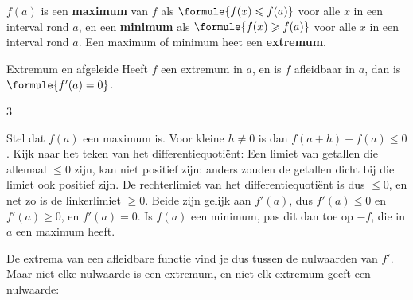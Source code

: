 \begin{theorie}
$f(a)$ is een \textbf{\textcolor{accent}{maximum}} van $f$ als $\formule{f(x) \leqslant f(a)}$ voor alle $x$ in een interval rond $a$, en een \textbf{\textcolor{accent}{minimum}} als $\formule{f(x) \geqslant f(a)}$ voor alle $x$ in een interval rond $a$. Een maximum of minimum heet een \textbf{\textcolor{accent}{extremum}}.

\begin{stelling}{Extremum en afgeleide}
Heeft $f$ een extremum in $a$, en is $f$ afleidbaar in $a$, dan is $\formule{f'(a) = 0}$.
\end{stelling}
\begin{alleenvoor}{3}
\begin{bewijs}
Stel dat $f(a)$ een maximum is. Voor kleine $h \neq 0$ is dan $f(a + h) - f(a) \leqslant 0$. Kijk naar het teken van het differentiequotiënt:
Een limiet van getallen die allemaal $\leqslant 0$ zijn, kan niet positief zijn: anders zouden de getallen dicht bij die limiet ook positief zijn. De rechterlimiet van het differentiequotiënt is dus $\leqslant 0$, en net zo is de linkerlimiet $\geqslant 0$. Beide zijn gelijk aan $f'(a)$, dus $f'(a) \leqslant 0$ en $f'(a) \geqslant 0$, en $f'(a) = 0$. Is $f(a)$ een minimum, pas dit dan toe op $-f$, die in $a$ een maximum heeft.
\end{bewijs}
\end{alleenvoor}
\end{theorie}

De extrema van een afleidbare functie vind je dus tussen de nulwaarden van $f'$. Maar niet elke nulwaarde is een extremum, en niet elk extremum geeft een nulwaarde:


